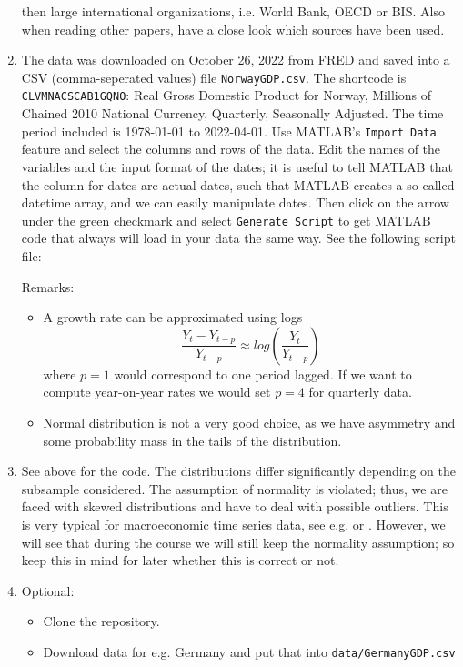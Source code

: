 \begin{enumerate}
  then large international organizations, i.e. World Bank, OECD or BIS.
Also when reading other papers, have a close look which sources have been used.
\item
The data was downloaded on October 26, 2022 from FRED and saved into a CSV (comma-seperated values) file \texttt{NorwayGDP.csv}.
The shortcode is \texttt{CLVMNACSCAB1GQNO}: Real Gross Domestic Product for Norway, Millions of Chained 2010 National Currency, Quarterly, Seasonally Adjusted.
The time period included is 1978-01-01 to 2022-04-01.
Use MATLAB's \texttt{Import Data} feature and select the columns and rows of the data.
Edit the names of the variables and the input format of the dates;
  it is useful to tell MATLAB that the column for dates are actual dates,
  such that MATLAB creates a so called datetime array,
  and we can easily manipulate dates.
Then click on the arrow under the green checkmark and select \texttt{Generate Script} to get MATLAB code that always will load in your data the same way.
See the following script file:

Remarks:
\begin{itemize}
    \item A growth rate can be approximated using logs $$\frac{Y_t - Y_{t-p}}{Y_{t-p}} \approx log \left(\frac{Y_t}{Y_{t-p}}\right)$$
      where $p=1$ would correspond to one period lagged. If we want to compute year-on-year rates we would set $p=4$ for quarterly data.
    \item Normal distribution is not a very good choice, as we have asymmetry and some probability mass in the tails of the distribution.		
\end{itemize}
\item See above for the code. The distributions differ significantly depending on the subsample considered.
The assumption of normality is violated; thus, we are faced with skewed distributions and have to deal with possible outliers.
This is very typical for macroeconomic time series data, see e.g. \textcite{Ascari.Fagiolo.Roventini_2015_FatTailDistributionsBusinessCycle} or \textcite{Fagiolo.Napoletano.Roventini_2008_AreOutputGrowthrate}.
However, we will see that during the course we will still keep the normality assumption;
  so keep this in mind for later whether this is correct or not.
\item Optional:
\begin{itemize}
    \item Clone the repository.
    \item Download data for e.g. Germany and put that into \texttt{data/GermanyGDP.csv}

\end{itemize}
\end{enumerate}

